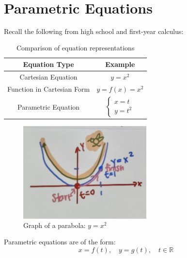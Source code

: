 \documentclass{article}
\begin{document}
\renewcommand{\familydefault}{\rmdefault}


\pagebreak
\normalsize

\section*{Parametric Equations}

\begin{tcolorbox}[colframe=RoyalBlue, colback=blue!5!white, title=Introduction]
Recall the following from high school and first-year calculus:
\end{tcolorbox}

\begin{table}[H]
\centering
\begin{tabular}{|c|c|}
\hline
\textbf{Equation Type} & \textbf{Example} \\
\hline
Cartesian Equation & $y = x^2$ \\
\hline
Function in Cartesian Form & $y = f(x) = x^2$ \\
\hline
Parametric Equation & $\begin{cases} x = t \\ y = t^2 \end{cases}$ \\
\hline
\end{tabular}
\caption{Comparison of equation representations}
\label{tab:equation_comparison}
\end{table}

\begin{figure}[H]
\centering
\includegraphics[width=0.6\textwidth]{parabola.jpg}
\caption{Graph of a parabola: $y = x^2$}
\label{fig:parabola}
\end{figure}

\begin{tcolorbox}[colframe=ForestGreen, colback=green!5!white, title=Parametric Equation Form]
Parametric equations are of the form:
\[ x = f(t), \quad y = g(t), \quad t \in \mathbb{R} \]
\end{tcolorbox}
\end{document}
